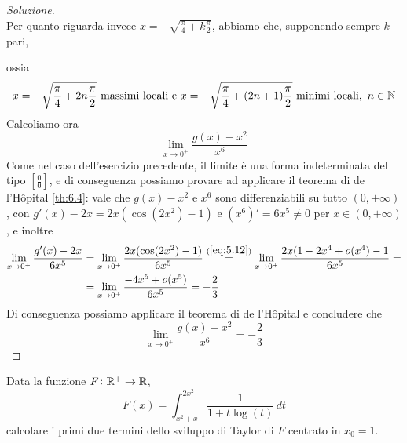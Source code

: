 \begin{proof}[Soluzione]
\[    \]
    Per quanto riguarda invece $x=-\sqrt{\frac{\pi}{4}+k\frac{\pi}{2}}$, abbiamo che, supponendo sempre $k$ pari,
    \begin{center}
    \end{center}
    ossia 
    \[
    x= -\sqrt{\frac{\pi}{4}+2n\frac{\pi}{2}} \ \text{massimi locali e} \ x= -\sqrt{\frac{\pi}{4}+(2n+1)\frac{\pi}{2}} \ \text{minimi locali},\ n\in\amsbb{N}
    \]
    Calcoliamo ora 
    \[
    \lim_{x\to 0^+} \frac{g(x)-x^2}{x^6}
    \]
    Come nel caso dell'esercizio precedente, il limite è una forma indeterminata del tipo $\left[\frac{0}{0}\right]$, e di conseguenza possiamo provare ad applicare il teorema di de l'H{\^o}pital \ref{th:6.4}: vale che $g(x)-x^2$ e $x^6$ sono differenziabili su tutto $(0,+\infty)$, con $g'(x)-2x = 2x(\cos(2x^2)-1)$ e $(x^6)' = 6x^5\ne 0$ per $x\in(0,+\infty)$, e inoltre
    \[
    \begin{split}
        \lim_{x\to 0^+} \frac{g'(x)-2x}{6x^5} & = \lim_{x\to 0^+} \frac{2x(\cos(2x^2)-1)}{6x^5} \overset{(\ref{eq:5.12})}{=} \lim_{x\to 0^+}\frac{2x(1-2x^4+o(x^4)-1}{6x^5} = \\
        & = \lim_{x\to 0^+} \frac{-4x^5+o(x^5)}{6x^5} = -\frac{2}{3}
    \end{split}
    \]
    Di conseguenza possiamo applicare il teorema di de l'H{\^o}pital e concludere che
    \[
    \lim_{x\to 0^+} \frac{g(x)-x^2}{x^6} = -\frac{2}{3}
    \]
\end{proof}
\begin{exercise}
    \label{ex:9.3}
    Data la funzione $F\colon\amsbb{R}^+\to \amsbb{R}$,
    \[
    F(x) = \int_{x^2+x}^{2x^2}\frac{1}{1+t\log(t)}\, dt
    \]
    calcolare i primi due termini dello sviluppo di Taylor di $F$ centrato in $x_0=1$.
\end{exercise}
